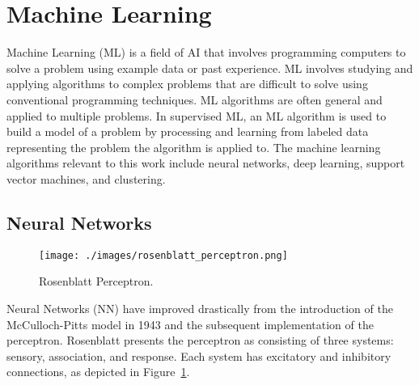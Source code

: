 \section{Machine Learning}

Machine Learning (ML) is a field of AI that involves programming computers to
solve a problem using example data or past
experience\cite{alpaydin2014introduction}. ML involves studying and applying
algorithms to complex problems that are difficult to solve using conventional
programming techniques. ML algorithms are often general and applied to multiple
problems. In supervised ML, an ML algorithm is used to build a model of a
problem by processing and learning from labeled data representing the problem
the algorithm is applied to\cite{rebala2019machine, alpaydin2014introduction}.
The machine learning algorithms relevant to this work include neural networks,
deep learning, support vector machines, and clustering.

\subsection{Neural Networks}


\begin{figure}[h]
    \centering
    \texttt{[image: ./images/rosenblatt\_perceptron.png]}
    \caption{Rosenblatt Perceptron\cite{rosenblatt1957perceptron}.}
    \label{fig:rosenblatt_perceptron}
\end{figure}

Neural Networks (NN) have improved drastically from the introduction of the
McCulloch-Pitts model in 1943\cite{McCulloch1943-MCCALC-5} and the subsequent
implementation of the perceptron\cite{rosenblatt1957perceptron, 4066017}.
Rosenblatt presents the perceptron as consisting of three systems: sensory,
association, and response. Each system has excitatory and inhibitory
connections, as depicted in Figure~\ref{fig:rosenblatt_perceptron}.



